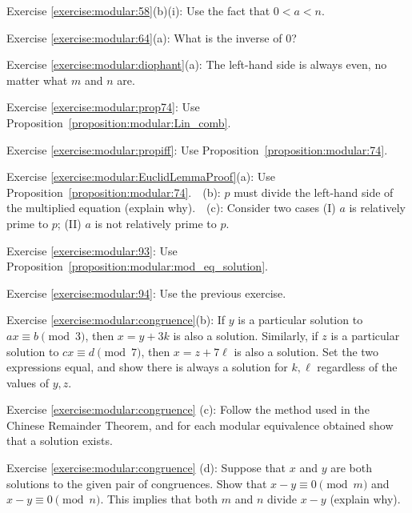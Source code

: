 \noindent Exercise \ref{exercise:modular:58}(b)(i): Use the fact that $0 < a < n$.

\noindent Exercise \ref{exercise:modular:64}(a): What is the inverse of $0$?

\noindent Exercise \ref{exercise:modular:diophant}(a): The left-hand side is always even, no matter what $m$ and $n$ are.

\noindent Exercise \ref{exercise:modular:prop74}: Use Proposition~\ref{proposition:modular:Lin_comb}.

\noindent Exercise \ref{exercise:modular:propiff}: Use Proposition~\ref{proposition:modular:74}.

\noindent Exercise \ref{exercise:modular:EuclidLemmaProof}(a): Use  Proposition~\ref{proposition:modular:74}.~~(b): $p$ must divide the left-hand side of the multiplied equation (explain why).~~(c): Consider two cases (I) $a$ is relatively prime to $p$; (II) $a$ is not relatively prime to $p$.

\noindent Exercise \ref{exercise:modular:93}: Use Proposition~\ref{proposition:modular:mod_eq_solution}. 

\noindent Exercise \ref{exercise:modular:94}: Use the previous exercise.

\noindent Exercise \ref{exercise:modular:congruence}(b):  If  $y$ is a particular solution to $ax \equiv b \pmod 3$, then $x=y+3k$ is also a solution. Similarly, if $z$ is 
 a particular solution to $cx \equiv d \pmod 7$, then $x=z+7\ell$ is also a solution. Set the two expressions equal, and show there is always a solution for $k, \ell$ regardless of the values of $y,z$.

\noindent Exercise \ref{exercise:modular:congruence}  (c): Follow the method used in the Chinese Remainder Theorem, and for each modular equivalence obtained show that a solution exists.

\noindent Exercise \ref{exercise:modular:congruence}  (d): Suppose that $x$ and $y$ are both solutions to the given pair of congruences. Show that 
$ x-y \equiv 0 \pmod{m}$ and $x-y \equiv 0 \pmod{n}$. This implies that both $m$ and $n$ divide $x-y$ (explain why).
